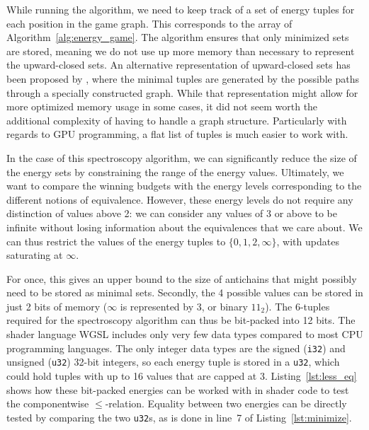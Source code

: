 While running the algorithm, we need to keep track of a set of energy tuples
for each position in the game graph.
This corresponds to the \Energies array of Algorithm~\ref{alg:energy_game}.
The algorithm ensures that only minimized sets are stored,
meaning we do not use up more memory than necessary to represent the
upward-closed sets.
An alternative representation of upward-closed sets has been proposed
by \textcite{Delzanno2000},
where the minimal tuples are generated by the possible
paths through a specially constructed graph.
While that representation might allow
for more optimized memory usage in some cases,
it did not seem worth the additional complexity
of having to handle a graph structure.
Particularly with regards to GPU programming, a flat list of tuples is much
easier to work with.

In the case of this spectroscopy algorithm, we can significantly reduce the
size of the energy sets by constraining the range of the energy values.
Ultimately, we want to compare the winning budgets with the energy levels
corresponding to the different notions of equivalence.
However, these energy levels do not require any distinction of values above 2:
we can consider any values of 3 or above to be infinite without losing
information about the equivalences that we care about.
We can thus restrict the values of the energy tuples to $\{0, 1, 2, \infty\}$,
with updates saturating at $\infty$.

For once, this gives an upper bound to the size of antichains that might
possibly need to be stored as minimal sets.
Secondly, the 4 possible values can be stored in just 2 bits of memory
($\infty$ is represented by 3, or binary $11_2$).
The 6-tuples required for the spectroscopy algorithm can thus be bit-packed
into 12 bits.
The shader language WGSL includes only very few data types compared to most CPU
programming languages.
The only integer data types are the signed (\texttt{i32}) and unsigned
(\texttt{u32}) 32-bit integers,
so each energy tuple is stored in a \texttt{u32},
which could hold tuples with up to 16 values that are capped at 3.
Listing~\ref{lst:less_eq} shows how these bit-packed energies can
be worked with in shader code to test the componentwise $\leq$-relation.
Equality between two energies can be directly tested by comparing the two
\texttt{u32}s,
as is done in line~7 of Listing~\ref{lst:minimize}.

